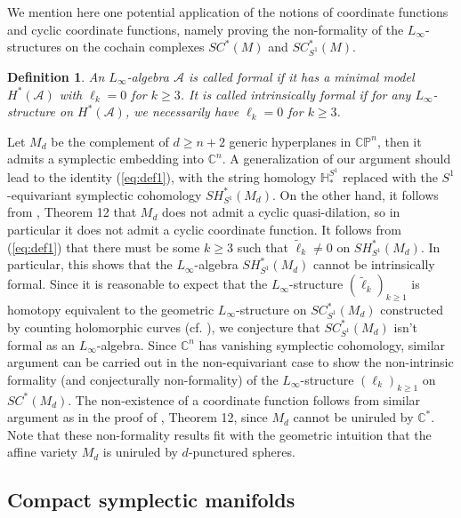 \documentclass[a4paper]{article}
\newtheorem{definition}[theorem]{Definition}
\numberwithin{equation}{section}
\begin{document}
We mention here one potential application of the notions of coordinate functions and cyclic coordinate functions, namely proving the non-formality of the $L_\infty$-structures on the cochain complexes $\mathit{SC}^\ast(M)$ and $\mathit{SC}^\ast_{S^1}(M)$.

\begin{definition}
An $L_\infty$-algebra $\mathcal{A}$ is called formal if it has a  minimal model $H^\ast(\mathcal{A})$ with $\ell_k=0$ for $k\geq3$. It is called intrinsically formal if for any $L_\infty$-structure on $H^\ast(\mathcal{A})$, we necessarily have $\ell_k=0$ for $k\geq3$.
\end{definition}

Let $M_d$ be the complement of $d\geq n+2$ generic hyperplanes in $\mathbb{CP}^n$, then it admits a symplectic embedding into $\mathbb{C}^n$. A generalization of our argument should lead to the identity (\ref{eq:def1}), with the string homology $\mathbb{H}_\ast^{S^1}$ replaced with the $S^1$-equivariant symplectic cohomology $\mathit{SH}_{S^1}^\ast(M_d)$. On the other hand, it follows from \cite{yl2}, Theorem 12 that $M_d$ does not admit a cyclic quasi-dilation, so in particular it does not admit a cyclic coordinate function. It follows from (\ref{eq:def1}) that there must be some $k\geq3$ such that $\tilde{\ell}_k\neq0$ on $\mathit{SH}_{S^1}^\ast(M_d)$. In particular, this shows that the $L_\infty$-algebra $\mathit{SH}_{S^1}^\ast(M_d)$ cannot be intrinsically formal. Since it is reasonable to expect that the $L_\infty$-structure $(\tilde{\ell}_k)_{k\geq1}$ is homotopy equivalent to the geometric $L_\infty$-structure on $\mathit{SC}_{S^1}^\ast(M_d)$ constructed by counting holomorphic curves (cf. \cite{ks}), we conjecture that $\mathit{SC}_{S^1}^\ast(M_d)$ isn't formal as an $L_\infty$-algebra. Since $\mathbb{C}^n$ has vanishing symplectic cohomology, similar argument can be carried out in the non-equivariant case to show the non-intrinsic formality (and conjecturally non-formality) of the $L_\infty$-structure $(\ell_k)_{k\geq1}$ on $\mathit{SC}^\ast(M_d)$. The non-existence of a coordinate function follows from similar argument as in the proof of \cite{yl2}, Theorem 12, since $M_d$ cannot be uniruled by $\mathbb{C}^\ast$. Note that these non-formality results fit with the geometric intuition that the affine variety $M_d$ is uniruled by $d$-punctured spheres.

\subsection{Compact symplectic manifolds}\label{section:compact}
\end{document}
